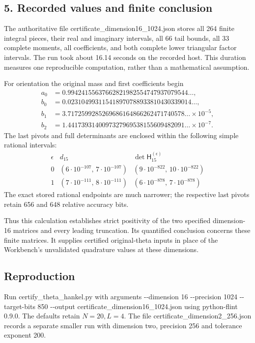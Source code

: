 \subsection{5. Recorded values and finite conclusion}\label{C47stage:CH:recorded-values-and-finite-conclusion}

The authoritative file certificate\_dimension16\_1024.json stores all 264 finite integral pieces, their real and imaginary intervals, all 66 tail bounds, all 33 complete moments, all coefficients, and both complete lower triangular factor intervals. The run took about 16.14 seconds on the recorded host. This duration measures one reproducible computation, rather than a mathematical assumption.

For orientation the original mass and first coefficients begin \[
\begin{split}
 a_0&=0.99424155637662821982554747937079544\ldots,\\
 b_0&=0.023104993115418970788933810430339014\ldots,\\
 b_1&=3.7172599285269686164866262471740578\ldots\times10^{-5},\\
 b_2&=1.4417393140097327969538155609482091\ldots\times10^{-7}.
\end{split}
\tag{CH.18}
\] The last pivots and full determinants are enclosed within the following simple rational intervals: \[
\begin{array}{c|c|c}
 \epsilon&
 d_{15}&\det \mathsf H_{15}^{(\epsilon)}\\ \hline
 0&(6\cdot10^{-107},\,7\cdot10^{-107})
   &(9\cdot10^{-822},\,10\cdot10^{-822})\\
 1&(7\cdot10^{-111},\,8\cdot10^{-111})
   &(6\cdot10^{-878},\,7\cdot10^{-878})
\end{array}
\tag{CH.19}
\] The exact stored rational endpoints are much narrower; the respective last pivots retain 656 and 648 relative accuracy bits.

Thus this calculation establishes strict positivity of the two specified dimension-16 matrices and every leading truncation. Its quantified conclusion concerns these finite matrices. It supplies certified original-theta inputs in place of the Workbench's unvalidated quadrature values at these dimensions.

\subsection{Reproduction}\label{C47stage:CH:reproduction}

Run certify\_theta\_hankel.py with arguments -\kern0pt-dimension 16 -\kern0pt-precision 1024 -\kern0pt-target-bits 850 -\kern0pt-output certificate\_dimension16\_1024.json using python-flint 0.9.0. The defaults retain \(N=20,L=4\). The file certificate\_dimension2\_256.json records a separate smaller run with dimension two, precision 256 and tolerance exponent 200.

